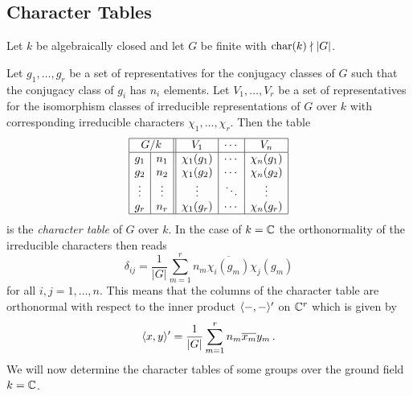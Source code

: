 \subsection{Character Tables}


\begin{fluff}
  Let $k$ be algebraically closed and let $G$ be finite with $\operatorname{char}(k) \nmid |G|$.
  
  Let $g_1, \dotsc, g_r$ be a set of representatives for the conjugacy classes of $G$ such that the conjugacy class of $g_i$ has $n_i$ elements.
  Let $V_1, \dotsc, V_r$ be a set of representatives for the isomorphism classes of irreducible representations of $G$ over $k$ with corresponding irreducible characters $\chi_1, \dotsc, \chi_r$.
  Then the table
  \[
    \begin{array}{|c|c||c|c|c|}
      \hline
        \multicolumn{2}{|c||}{G/k}
      & V_1
      & \cdots
      & V_n
      \\
      \hline
        g_1
      & n_1
      & \chi_1(g_1)
      & \cdots
      & \chi_n(g_1)
      \\
        g_2
      & n_2
      & \chi_1(g_2)
      & \cdots
      & \chi_n(g_2)
      \\
        \vdots
      & \vdots
      & \vdots
      & \ddots
      & \vdots
      \\
        g_r
      & n_r
      & \chi_1(g_r)
      & \cdots
      & \chi_n(g_r)
      \\
      \hline
    \end{array}
  \]
  is the \emph{character table} of $G$ over $k$.
  In the case of $k = \mathbb{C}$ the orthonormality of the irreducible characters then reads
  \[
      \delta_{ij}
    = \frac{1}{|G|} \sum_{m=1}^r n_m \overline{\chi_i(g_m)} \chi_j(g_m)
  \]
  for all $i, j = 1, \dotsc, n$.
  This means that the columns of the character table are orthonormal with respect to the inner product $\langle -,- \rangle'$ on $\mathbb{C}^r$ which is given by
  \[
      \langle x,y \rangle'
    = \frac{1}{|G|} \sum_{m=1}^r n_m \overline{x_m} y_m \,.
  \]
  We will now determine the character tables of some groups over the ground field $k = \mathbb{C}$.
\end{fluff}


